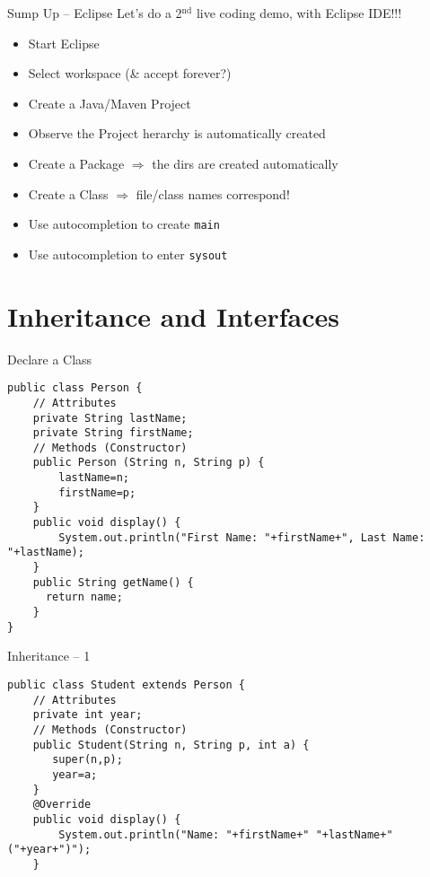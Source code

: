 \documentclass[English,c,%
hyperref={%
    pdftitle={FISA-DE2 OOP in Java},%
    pdfauthor={Muller, Gravier, Laforest, Subercaze},%
    pdfsubject={OOP in Java},%
    pdfkeywords={OOP, Java}%
    },%
xcolor={pdftex,svgnames} %
]{beamer}
\begin{document}
\begin{frame}{Sump Up -- Eclipse}
Let's do a 2$^{\text{nd}}$ live coding demo, with Eclipse IDE!!!
\begin{itemize}
  \item Start Eclipse
  \item Select workspace (\& accept forever?)
  \item Create a Java/Maven Project
  \item Observe the Project herarchy is automatically created
  \item Create a Package $\Rightarrow$ the dirs are created automatically
  \item Create a Class $\Rightarrow$ file/class names correspond!
  \item Use autocompletion to create \texttt{main}
  \item Use autocompletion to enter \texttt{sysout}
\end{itemize}
\end{frame}

\section{Inheritance and Interfaces}

\begin{frame}[fragile]{Declare a Class}
\vspace{-1em}
  \begin{lstlisting}[escapechar=\%,label=expers,caption=Person.java,basicstyle=\scriptsize]
public class Person {
    // Attributes
    private String lastName;
    private String firstName;
    // Methods (Constructor)
    public Person (String n, String p) {
        lastName=n;
        firstName=p;
    }
    public void display() {
        System.out.println("First Name: "+firstName+", Last Name: "+lastName);
    }
    public String getName() {
      return name;
    }
}
\end{lstlisting}
\end{frame}


\begin{frame}[fragile]{Inheritance -- 1}
\vspace{-1em}
\begin{lstlisting}[escapechar=\%,label=exelv,caption=Student.java,basicstyle=\scriptsize]
public class Student extends Person {
    // Attributes
    private int year;
    // Methods (Constructor)
    public Student(String n, String p, int a) {
       super(n,p);
       year=a;
    }
    @Override
    public void display() {
        System.out.println("Name: "+firstName+" "+lastName+" ("+year+")");
    }
\end{lstlisting}
\end{frame}
\end{document}
